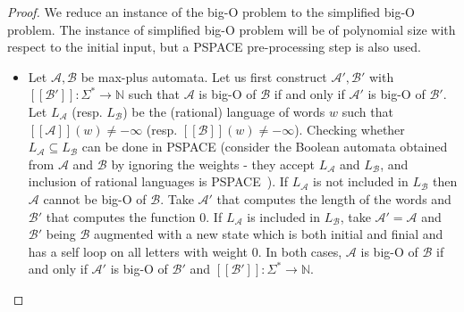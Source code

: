 \documentclass{lmcs}
\theoremstyle{remark}
\newcommand{\N}{\mathbb{N}}
\newcommand{\autA}{\mathcal{A}}
\newcommand{\autB}{\mathcal{B}}
\newcommand{\brfunc}[1]{[\![#1]\!]}
\newcommand{\funcA}{\brfunc{\autA}}
\newcommand{\funcB}{\brfunc{\autB}}
\theoremstyle{remark}
\begin{document}
\begin{proof}
We reduce an instance of the big-O problem to the simplified big-O problem. The instance of simplified big-O problem will be of polynomial size with respect to the initial input, but a PSPACE pre-processing step is also used.
\begin{itemize}
\item Let $\autA,\autB$ be max-plus automata. Let us first construct $\autA',\autB'$ with $\brfunc{\autB'}:\Sigma^* \to \N$ such that $\autA$ is big-O of $\autB$ if and only if  $\autA'$ is big-O of $\autB'$. Let $L_\autA$ (resp. $L_\autB$) be the (rational) language of words $w$ such that $\funcA(w) \neq -\infty$ (resp. $\funcB(w) \neq -\infty$). Checking whether $L_\autA \subseteq L_\autB$ can be done in PSPACE (consider the Boolean automata obtained from $\autA$ and $\autB$ by ignoring the weights - they accept $L_\autA$ and $L_\autB$, and inclusion of rational languages is PSPACE~\cite{MeyerS72}). If $L_\autA$ is not included in $L_\autB$ then $\autA$ cannot be big-O of $\autB$. Take $\autA'$ that computes the length of the words and $\autB'$ that computes the function $0$. If $L_\autA$ is included in $L_\autB$, take $\autA' = \autA$ and $\autB'$ being $\autB$ augmented with a new state which is both initial and finial and has a self loop on all letters with weight $0$. In both cases, $\autA$ is big-O of $\autB$ if and only if  $\autA'$ is big-O of $\autB'$ and $\brfunc{\autB'}:\Sigma^* \to \N$.


\end{itemize}
\end{proof}
\end{document}
